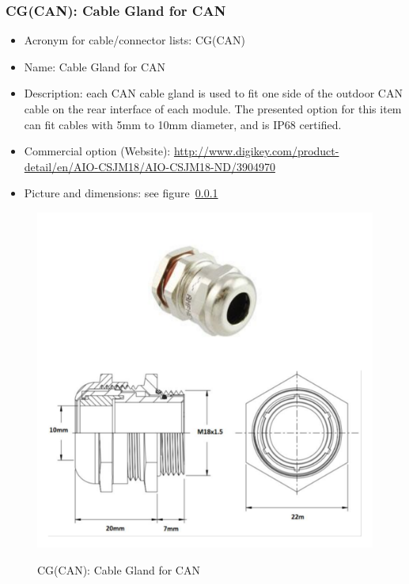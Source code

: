 \subsubsection{CG(CAN): Cable Gland for CAN} \label{DEVICE:CG(CAN)}
\begin{itemize}
  \item Acronym for cable/connector lists: CG(CAN)
  \item Name: Cable Gland for CAN
  \item Description: each CAN cable gland is used to fit one side of the outdoor CAN cable on the rear interface of each module. The presented option for this item can fit cables with 5mm to 10mm diameter, and is IP68 certified.
  \item Commercial option (Website): \href{http://www.digikey.com/product-detail/en/AIO-CSJM18/AIO-CSJM18-ND/3904970}{http://www.digikey.com/product-detail/en/AIO-CSJM18/AIO-CSJM18-ND/3904970}
  \item Picture and dimensions: see figure~\ref{DEVICE:CG(CAN)}
\end{itemize}
\begin{figure}
  \centering
  \includegraphics[angle=90,width=1\columnwidth]{figs/body02/FIGDEVICECG(CAN).pdf}\\
  \caption[CG(CAN): Cable Gland for CAN]{CG(CAN): Cable Gland for CAN}
  \label{FIG:DEVICE:CG(CAN)}
\end{figure}
